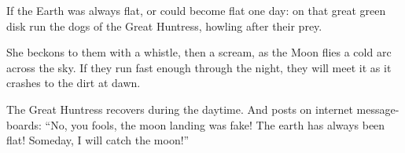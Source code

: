 
If the Earth was always flat, or could become flat one day: on that
great green disk run the dogs of the Great Huntress, howling after their
prey.

She beckons to them with a whistle, then a scream, as the Moon flies a
cold arc across the sky. If they run fast enough through the night, they
will meet it as it crashes to the dirt at dawn.

The Great Huntress recovers during the daytime. And posts on internet
message-boards: ``No, you fools, the moon landing was fake! The earth
has always been flat! Someday, I will catch the moon!''
